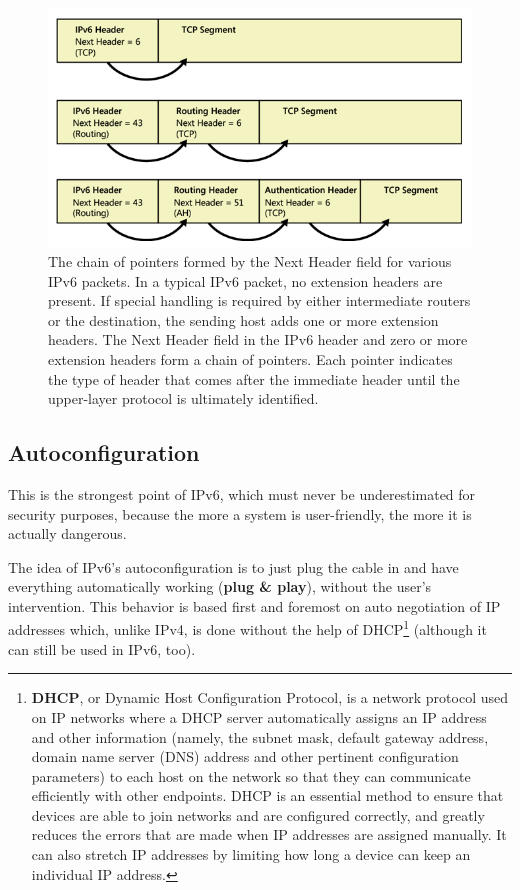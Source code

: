 \begin{figure}[h]
    \centering
    \includegraphics[scale=0.8]{img/ipv6_header_pointers.png}
    \decoRule
    \caption{
    The chain of pointers formed by the Next Header field for various IPv6 packets. In a typical IPv6 packet, no extension headers are present. If special handling is required by either intermediate routers or the destination, the sending host adds one or more extension headers. The Next Header field in the IPv6 header and zero or more extension headers form a chain of pointers. Each pointer indicates the type of header that comes after the immediate header until the upper-layer protocol is ultimately identified.}
    \label{fig:ipv6_header_pointers}
\end{figure}


\subsection{Autoconfiguration}
This is the strongest point of IPv6, which must never be underestimated for security purposes, because the more a system is user-friendly, the more it is actually dangerous.

The idea of IPv6's autoconfiguration is to just plug the cable in and have everything automatically working (\textbf{plug \& play}), without the user's intervention. This behavior is based first and foremost on auto negotiation of IP addresses which, unlike IPv4, is done without the help of DHCP\footnote{\textbf{DHCP}, or Dynamic Host Configuration Protocol, is a network protocol used on IP networks where a DHCP server automatically assigns an IP address and other information (namely, the subnet mask, default gateway address, domain name server (DNS) address and other pertinent configuration parameters) to each host on the network so that they can communicate efficiently with other endpoints. DHCP is an essential method to ensure that devices are able to join networks and are configured correctly, and greatly reduces the errors that are made when IP addresses are assigned manually. It can also stretch IP addresses by limiting how long a device can keep an individual IP address.} (although it can still be used in IPv6, too).

